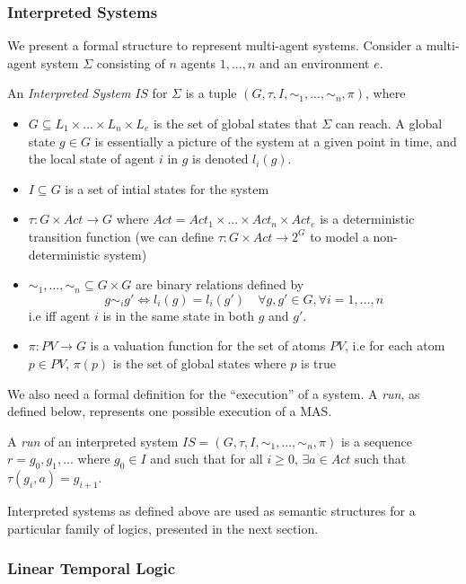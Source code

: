 \documentclass[11pt]{article}
\newenvironment{definition}[1][Definition]{\begin{trivlist}
\item[\hskip \labelsep {\bfseries #1}]}{\end{trivlist}}
\begin{document}
\subsubsection{Interpreted Systems}
\label{IS}
We present a formal structure to represent multi-agent systems. Consider a multi-agent system $\Sigma$ consisting of $n$ agents $1, ..., n$ and an environment $e$.
\begin{definition}
An \textit{Interpreted System} $IS$ for $\Sigma$ is a tuple $(G, \tau, I, \sim_1, ..., \sim_n, \pi)$, where
\begin{itemize}
\item $G \subseteq L_1 \times ... \times L_n \times L_e$ is the set of global states that $\Sigma$ can reach. A global state $g \in G$ is essentially a picture of the system at a given point in time, and the local state of agent $i$ in $g$ is denoted $l_i(g)$.
\item $I \subseteq G$ is a set of intial states for the system
\item $\tau : G \times Act \rightarrow G $ where $Act = Act_1 \times ... \times Act_n \times Act_e$ is a deterministic transition function (we can define $\tau : G \times Act \rightarrow 2^G$ to model a non-deterministic system)
\item $\sim_1, ..., \sim_n \subseteq G \times G$  are binary relations defined by $$g \sim_i g' \Leftrightarrow l_i(g) = l_i(g') \quad \forall g, g' \in G, \forall i = 1, ..., n$$
i.e iff agent $i$ is in the same state in both $g$ and $g'$. 
\item $\pi : PV \rightarrow G$ is a valuation function for the set of atoms $PV$, i.e for each atom $p \in PV$, $\pi(p)$ is the set of global states where $p$ is true
\end{itemize}
\end{definition}
We also need a formal definition for the ``execution'' of a system. A \emph{run}, as defined below, represents one possible execution of a MAS. 
\begin{definition} 
A \emph{run} of an interpreted system $IS = (G, \tau, I, \sim_1, ..., \sim_n, \pi)$ is a sequence $r = g_0, g_1, ...$ where $g_0 \in I$ and such that for all $i \geq 0$, $\exists a \in Act$ such that $\tau(g_i, a) = g_{i+1}$.
\end{definition}

Interpreted systems as defined above are used as semantic structures for a particular family of logics, presented in the next section.

\subsubsection{Linear Temporal Logic} 
\label{LTL}
\end{document}
